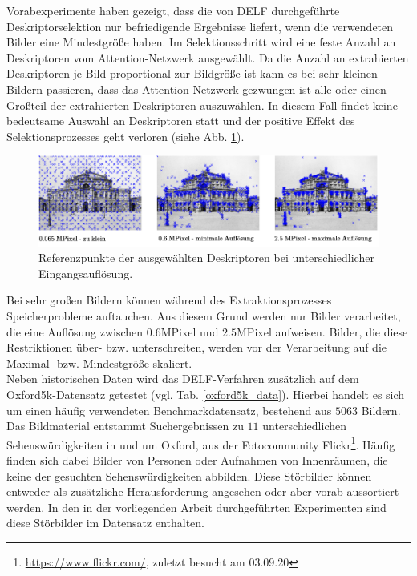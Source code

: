 Vorabexperimente haben gezeigt, dass die von DELF durchgeführte Deskriptorselektion nur befriedigende Ergebnisse liefert, wenn die verwendeten Bilder eine Mindestgröße haben. Im Selektionsschritt wird eine feste Anzahl an Deskriptoren vom Attention-Netzwerk ausgewählt. Da die Anzahl an extrahierten Deskriptoren je Bild proportional zur Bildgröße ist kann es bei sehr kleinen Bildern passieren, dass das Attention-Netzwerk gezwungen ist alle oder einen Großteil der extrahierten Deskriptoren auszuwählen. In diesem Fall findet keine bedeutsame Auswahl an Deskriptoren statt und der positive Effekt des Selektionsprozesses geht verloren (siehe Abb. \ref{small_img}).
\begin{figure}[h]
\includegraphics[scale=0.955]{scale_descriptor_selection.pdf}
\caption{Referenzpunkte der ausgewählten Deskriptoren bei unterschiedlicher Eingangsauflösung.}
\label{small_img}
\end{figure}
Bei sehr großen Bildern können während des Extraktionsprozesses Speicherprobleme auftauchen. Aus diesem Grund werden nur Bilder verarbeitet, die eine Auflösung zwischen $0.6$MPixel und $2.5$MPixel aufweisen. Bilder, die diese Restriktionen über- bzw. unterschreiten, werden vor der Verarbeitung auf die Maximal- bzw. Mindestgröße skaliert.\\
Neben historischen Daten wird das DELF-Verfahren zusätzlich auf dem Oxford5k-Datensatz \cite{oxford5k} getestet (vgl. Tab. \ref{oxford5k_data}). Hierbei handelt es sich um einen häufig verwendeten Benchmarkdatensatz, bestehend aus $5063$ Bildern. Das Bildmaterial entstammt Suchergebnissen zu $11$ unterschiedlichen Sehenswürdigkeiten in und um Oxford, aus der Fotocommunity Flickr\footnote{\url{https://www.flickr.com/}, zuletzt besucht am 03.09.20}. Häufig finden sich dabei Bilder von Personen oder Aufnahmen von Innenräumen, die keine der gesuchten Sehenswürdigkeiten abbilden. Diese Störbilder können entweder als zusätzliche Herausforderung angesehen oder aber vorab aussortiert werden. In den in der vorliegenden Arbeit durchgeführten Experimenten sind diese Störbilder im Datensatz enthalten. 
